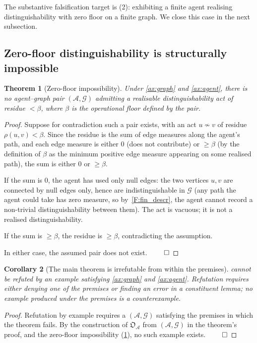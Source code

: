 \documentclass[11pt,a4paper]{article}
\theoremstyle{thmstyle}
\newtheorem{theorem}{Theorem}[section]
\newtheorem{corollary}[theorem]{Corollary}
\theoremstyle{definition}
\theoremstyle{remark}
\newcommand{\Graph}{\mathcal{G}}
\newcommand{\Agent}{\mathcal{A}}
\newcommand{\Res}{\rho}
\newcommand{\floor}{\beta}
\newcommand{\OpStr}{\mathfrak{O}}
\begin{document}
The substantive falsification target is (2): exhibiting a finite
agent realising distinguishability with zero floor on a finite
graph. We close this case in the next subsection.

\subsection{Zero-floor distinguishability is structurally impossible}

\begin{theorem}[Zero-floor impossibility]
\label{thm:zero_floor}
Under \cref{ax:graph} and \cref{ax:agent}, there is no agent--graph
pair $(\Agent, \Graph)$ admitting a realisable distinguishability
act of residue $< \floor$, where $\floor$ is the operational floor
defined by the pair.
\end{theorem}

\begin{proof}
Suppose for contradiction such a pair exists, with an act
$u \not\sim v$ of residue $\Res(u, v) < \floor$. Since the residue
is the sum of edge measures along the agent's path, and each edge
measure is either $0$ (does not contribute) or $\geq \floor$ (by
the definition of $\floor$ as the minimum positive edge measure
appearing on some realised path), the sum is either $0$ or
$\geq \floor$.

If the sum is $0$, the agent has used only null edges: the two
vertices $u, v$ are connected by null edges only, hence are
indistinguishable in $\Graph$ (any path the agent could take has
zero measure, so by~\ref{F:fin_descr}, the agent cannot record a
non-trivial distinguishability between them). The act is vacuous;
it is not a realised distinguishability.

If the sum is $\geq \floor$, the residue is $\geq \floor$,
contradicting the assumption.

In either case, the assumed pair does not exist. $\qed$
\end{proof}

\begin{corollary}[The main theorem is irrefutable from within the
premises]
\label{cor:irrefutable}
 cannot be refuted by an example satisfying
\cref{ax:graph} and \cref{ax:agent}. Refutation requires either
denying one of the premises or finding an error in a constituent
lemma; no example produced under the premises is a counterexample.
\end{corollary}

\begin{proof}
Refutation by example requires a $(\Agent, \Graph)$ satisfying the
premises in which the theorem fails. By the construction of
$\OpStr_\Agent$ from $(\Agent, \Graph)$ in the theorem's proof, and
the zero-floor impossibility (\cref{thm:zero_floor}), no such
example exists. $\qed$
\end{proof}
\end{document}
